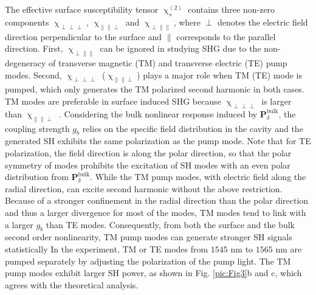 \documentclass[a4paper,8pt,hyperref, twocolumn]{article}
\begin{document}
The effective surface susceptibility tensor $\upchi^{(2)}_s$ contains three non-zero components $\upchi_{\perp \perp \perp}$, $\upchi_{\parallel \parallel \perp}$ and $\upchi_{\perp \parallel \parallel}$, where $\perp$ denotes the electric field direction perpendicular to the surface and $\parallel$ corresponds to the parallel direction. 
First, $\upchi_{\perp \parallel \parallel}$ can be ignored in studying SHG due to the non-degeneracy of transverse magnetic (TM) and  transverse electric (TE) pump modes.  
Second, $\upchi_{\perp \perp \perp}$ ($\upchi_{\parallel \parallel \perp}$) plays a major role when TM (TE) mode is pumped, which only generates the TM polarized second harmonic in both cases. 
TM modes are preferable in surface induced SHG because $\upchi_{\perp \perp \perp}$ is larger than $\upchi_{\parallel \parallel \perp}$ \cite{rodriguez2008calibration}. 
Considering the bulk nonlinear response induced by $\mathbf{P}^{\mathrm{bulk}}_\delta$, the coupling strength $g_b$ relies on the specific field distribution in the cavity and the generated SH exhibits the same polarization as the pump mode. 
Note that for TE polarization, the field direction is along the polar direction, so that the polar symmetry of modes prohibits the excitation of SH modes with an even polar distribution from $\mathbf{P}^{\mathrm{bulk}}_\delta$. 
While the TM pump modes, with electric field along the radial direction, can excite second harmonic without the above restriction.
Because of a stronger confinement in the radial direction than the polar direction and thus a larger divergence for most of the modes, TM modes tend to link with a larger $g_b$ than TE modes. 
Consequently, from both the surface and the bulk second order nonlinearity, TM pump modes can generate stronger SH signals statistically
In the experiment, TM or TE modes from $1545$ nm to $1565$ nm are pumped separately by adjusting the polarization of the pump light.
The TM pump modes exhibit larger SH power, as shown in Fig. \ref{pic:Fig3}b and c, which agrees with the theoretical analysis.

\end{document}
